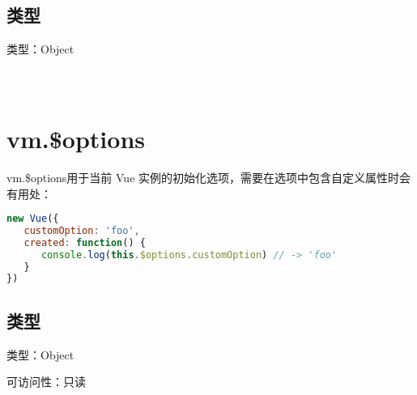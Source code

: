 \subsection{类型}

\begin{compactitem}
\item 类型：Object
\end{compactitem}


\begin{lstlisting}[language=JavaScript]

\end{lstlisting}




\begin{lstlisting}[language=JavaScript]

\end{lstlisting}




\begin{lstlisting}[language=JavaScript]

\end{lstlisting}

\section{vm.\$options}

vm.\$options用于当前 Vue 实例的初始化选项，需要在选项中包含自定义属性时会有用处：

\begin{lstlisting}[language=JavaScript]
new Vue({
   customOption: 'foo',
   created: function() {
      console.log(this.$options.customOption) // -> 'foo'
   }
})
\end{lstlisting}


\subsection{类型}


\begin{compactitem}
\item 类型：Object
\item 可访问性：只读
\end{compactitem}


\begin{lstlisting}[language=JavaScript]

\end{lstlisting}




\begin{lstlisting}[language=JavaScript]

\end{lstlisting}




